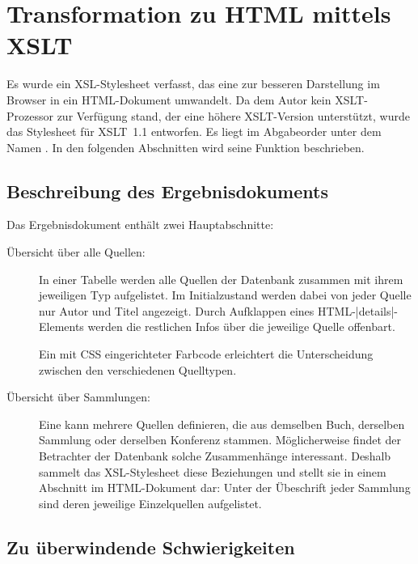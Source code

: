 \section[Transformation zu HTML]{Transformation zu HTML mittels XSLT}

\def\xsltemplateexpandvalue{\lstinlineXML|compute-value|}
\def\xsltemplatecollectionoverview{\lstinlineXML|collection-overview|}

Es wurde ein XSL-Stylesheet verfasst, das eine \BibTeXXMLdatabase{} zur besseren
Darstellung im Browser in ein HTML-Dokument umwandelt. Da dem Autor kein
XSLT-Prozessor zur Verfügung stand, der eine höhere XSLT-Version unterstützt,
wurde das Stylesheet für XSLT~1.1 entworfen. Es liegt im Abgabeorder unter dem
Namen \fBibTeXXMLtohtml. In den folgenden Abschnitten wird seine Funktion
beschrieben.

\subsection{Beschreibung des Ergebnisdokuments}
\label{subsec:beschreibung-des-ergebnisdokuments}

Das Ergebnisdokument enthält zwei Hauptabschnitte:
\begin{description}
    \item[Übersicht über alle Quellen:] In einer Tabelle werden alle Quellen der
        Datenbank zusammen mit ihrem jeweiligen Typ aufgelistet. Im
        Initialzustand werden dabei von jeder Quelle nur Autor und Titel
        angezeigt. Durch Aufklappen eines
        HTML-\mbox{\lstinlinehtml|details|-}Elements werden die restlichen Infos
        über die jeweilige Quelle offenbart.
        
        Ein mit CSS eingerichteter Farbcode erleichtert die Unterscheidung
        zwischen den verschiedenen Quelltypen.
    \item[Übersicht über Sammlungen:] Eine \BibTeXXMLdatabase{} kann mehrere
        Quellen definieren, die aus demselben Buch, derselben Sammlung oder
        derselben Konferenz stammen. Möglicherweise findet der Betrachter der
        Datenbank solche Zusammenhänge interessant. Deshalb sammelt das
        XSL-Stylesheet diese Beziehungen und stellt sie in einem Abschnitt im
        HTML-Dokument dar: Unter der Übeschrift jeder Sammlung sind deren
        jeweilige Einzelquellen aufgelistet.
\end{description}

\subsection{Zu überwindende Schwierigkeiten}

